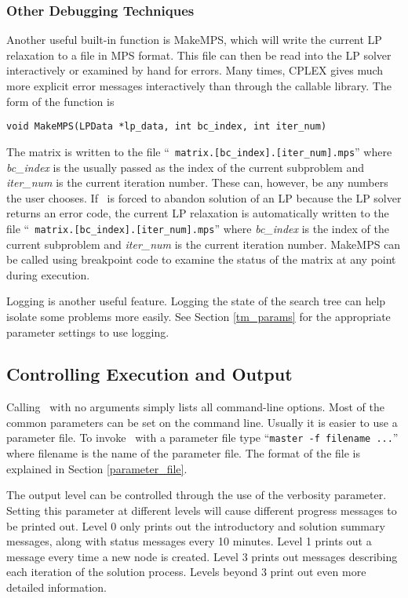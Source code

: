 \subsubsection{Other Debugging Techniques}

Another useful built-in function is MakeMPS, which will write the
current LP relaxation to a file in MPS format. This file can then be
read into the LP solver interactively or examined by hand for errors.
Many times, CPLEX gives much more explicit error messages
interactively than through the callable library. The form of the
function is 
\begin{verbatim}
void MakeMPS(LPData *lp_data, int bc_index, int iter_num)
\end{verbatim}
The matrix is written to the file ``{\tt
matrix.[bc\_index].[iter\_num].mps}'' where {\em bc\_index} is the
usually passed as the index of the current subproblem and {\em
iter\_num} is the current iteration number. These can, however, be any
numbers the user chooses. If \BB\ is forced to abandon solution
of an LP because the LP solver returns an error code, the current LP
relaxation is automatically written to the file ``{\tt
matrix.[bc\_index].[iter\_num].mps}'' where {\em bc\_index} is the
index of the current subproblem and {\em iter\_num} is the current
iteration number. MakeMPS can be called using breakpoint code to
examine the status of the matrix at any point during execution.

Logging is another useful feature. Logging the state of the search tree can
help isolate some problems more easily. See Section \ref{tm_params}
for the appropriate parameter settings to use logging.

\subsection{Controlling Execution and Output}
\label{output}
Calling \BB\ with no arguments simply lists all command-line options.
Most of the common parameters can be set on the command line. Usually
it is easier to use a parameter file. To invoke \BB\ with a parameter
file type ``{\tt master -f filename ...}'' where filename is the name
of the parameter file. The format of the file is explained in Section
\ref{parameter_file}. 

The output level can be controlled through the use of the verbosity
parameter. Setting this parameter at different levels will cause
different progress messages to be printed out. Level 0 only prints out
the introductory and solution summary messages, along with status
messages every 10 minutes. Level 1 prints out a message every time a
new node is created. Level 3 prints out messages describing each
iteration of the solution process. Levels beyond 3 print out even more
detailed information.

